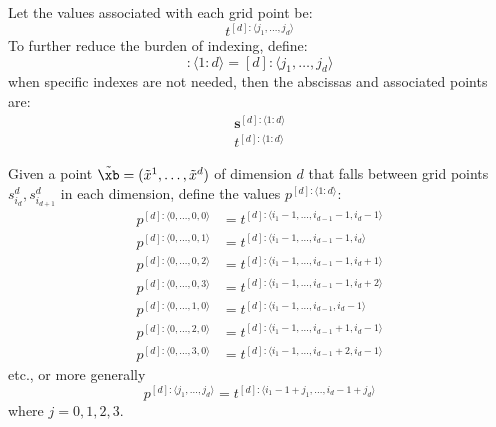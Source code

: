 \documentclass[11pt]{article}
\newcommand{\sbf}{\boldsymbol{s}}
\begin{document}
Let the values associated with each grid point be:
\begin{equation}
t^{[d] : \langle j_1,\dots,j_d \rangle}
\end{equation}
To further reduce the burden of indexing, define:
\begin{equation}
[d]: \langle 1:d \rangle  = [d]: \langle j_1, \dots, j_d \rangle
\end{equation}
when specific indexes are not needed, then the abscissas and associated points are:
\begin{equation*}
\begin{split}
\sbf^{[d]: \langle 1:d \rangle} \\
t^{[d]: \langle 1:d \rangle}
\end{split}
\end{equation*}

Given a point $\tilde{\xb} = (\tilde{x}^1, \dots, \tilde{x}^d)$ of dimension $d$ that falls between grid points $s_{i_d}^d, s_{i_{d+1}}^d$ in each dimension, define the values $p^{[d]: \langle 1:d \rangle}$:
\begin{equation*}
\begin{split}
p^{[d]:\langle 0, \dots, 0,0 \rangle} &= t^{[d]:\langle i_1-1, \dots, i_{d-1}-1, i_d-1 \rangle} \\
p^{[d]:\langle 0, \dots, 0,1 \rangle} &= t^{[d]:\langle i_1-1, \dots, i_{d-1}-1, i_d \rangle} \\
p^{[d]:\langle 0, \dots, 0,2 \rangle} &= t^{[d]:\langle i_1-1, \dots, i_{d-1}-1, i_d+1 \rangle} \\
p^{[d]:\langle 0, \dots, 0,3 \rangle} &= t^{[d]:\langle i_1-1, \dots, i_{d-1}-1, i_d+2 \rangle} \\
p^{[d]:\langle 0, \dots, 1,0 \rangle} &= t^{[d]:\langle i_1-1, \dots, i_{d-1}, i_d-1 \rangle} \\
p^{[d]:\langle 0, \dots, 2,0 \rangle} &= t^{[d]:\langle i_1-1, \dots, i_{d-1}+1, i_d-1 \rangle} \\
p^{[d]:\langle 0, \dots, 3,0 \rangle} &= t^{[d]:\langle i_1-1, \dots, i_{d-1}+2, i_d-1 \rangle}
\end{split}
\end{equation*}
etc., or more generally
\begin{equation*}
p^{[d]:\langle j_1, \dots, j_d \rangle} = t^{[d]:\langle i_1-1+j_1, \dots, i_d-1+j_d \rangle} 
\end{equation*}
where $j=0,1,2,3$.
\end{document}
